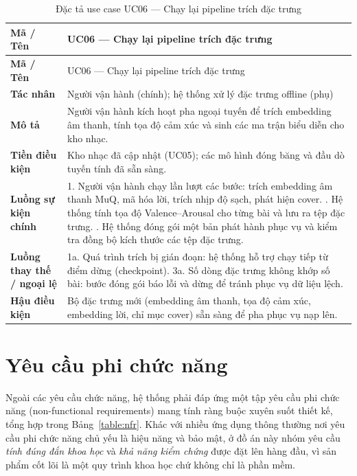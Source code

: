 \documentclass[../DoAn.tex]{subfiles}
\begin{document}
\begin{longtable}{|p{3.0cm}|p{11.0cm}|}
\caption{Đặc tả use case UC06 --- Chạy lại pipeline trích đặc trưng}\label{table:uc06}\\
\hline
\textbf{Mã / Tên} & UC06 --- Chạy lại pipeline trích đặc trưng \\
\hline
\endfirsthead
\hline
\textbf{Mã / Tên} & UC06 --- Chạy lại pipeline trích đặc trưng \\
\hline
\endhead
\textbf{Tác nhân} & Người vận hành (chính); hệ thống xử lý đặc trưng offline (phụ) \\ \hline
\textbf{Mô tả} & Người vận hành kích hoạt pha ngoại tuyến để trích embedding âm thanh, tính tọa độ cảm xúc và sinh các ma trận biểu diễn cho kho nhạc. \\ \hline
\textbf{Tiền điều kiện} & Kho nhạc đã cập nhật (UC05); các mô hình đóng băng và đầu dò tuyến tính đã sẵn sàng. \\ \hline
\textbf{Luồng sự kiện chính} & 1. Người vận hành chạy lần lượt các bước: trích embedding âm thanh MuQ, mã hóa lời, trích nhịp độ sạch, phát hiện cover. \newline 2. Hệ thống tính tọa độ Valence--Arousal cho từng bài và lưu ra tệp đặc trưng. \newline 3. Hệ thống đóng gói một bản phát hành phục vụ và kiểm tra đồng bộ kích thước các tệp đặc trưng. \\ \hline
\textbf{Luồng thay thế / ngoại lệ} & 1a. Quá trình trích bị gián đoạn: hệ thống hỗ trợ chạy tiếp từ điểm dừng (checkpoint). \newline 3a. Số dòng đặc trưng không khớp số bài: bước đóng gói báo lỗi và dừng để tránh phục vụ dữ liệu lệch. \\ \hline
\textbf{Hậu điều kiện} & Bộ đặc trưng mới (embedding âm thanh, tọa độ cảm xúc, embedding lời, chỉ mục cover) sẵn sàng để pha phục vụ nạp lên. \\ \hline
\end{longtable}

\section{Yêu cầu phi chức năng}
\label{section:2.4}
Ngoài các yêu cầu chức năng, hệ thống phải đáp ứng một tập yêu cầu phi chức năng (non-functional requirements) mang tính ràng buộc xuyên suốt thiết kế, tổng hợp trong Bảng~\ref{table:nfr}. Khác với nhiều ứng dụng thông thường nơi yêu cầu phi chức năng chủ yếu là hiệu năng và bảo mật, ở đồ án này nhóm yêu cầu \textit{tính đúng đắn khoa học} và \textit{khả năng kiểm chứng} được đặt lên hàng đầu, vì sản phẩm cốt lõi là một quy trình khoa học chứ không chỉ là phần mềm.
\end{document}
